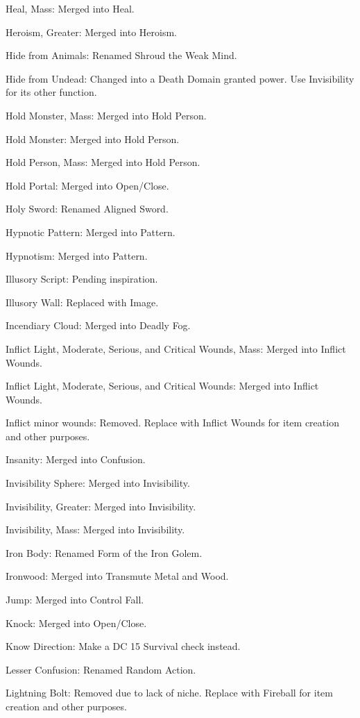 {\begin{list}{}{\leftmargin=1em}
 \item Heal, Mass: Merged into Heal.
 \item Heroism, Greater: Merged into Heroism.
 \item Hide from Animals: Renamed Shroud the Weak Mind.
 \item Hide from Undead: Changed into a Death Domain granted power. Use Invisibility for its other function.
 \item Hold Monster, Mass: Merged into Hold Person.
 \item Hold Monster: Merged into Hold Person.
 \item Hold Person, Mass: Merged into Hold Person.
 \item Hold Portal: Merged into Open/Close.
 \item Holy Sword: Renamed Aligned Sword.
 \item Hypnotic Pattern: Merged into Pattern.
 \item Hypnotism: Merged into Pattern.
 \item Illusory Script: Pending inspiration.
 \item Illusory Wall: Replaced with Image. 
 \item Incendiary Cloud: Merged into Deadly Fog.
 \item Inflict Light, Moderate, Serious, and Critical Wounds, Mass: Merged into Inflict Wounds.
 \item Inflict Light, Moderate, Serious, and Critical Wounds: Merged into Inflict Wounds.
 \item Inflict minor wounds: Removed. Replace with Inflict Wounds for item creation and other purposes.
 \item Insanity: Merged into Confusion.
 \item Invisibility Sphere: Merged into Invisibility.
 \item Invisibility, Greater: Merged into Invisibility.
 \item Invisibility, Mass: Merged into Invisibility.
 \item Iron Body: Renamed Form of the Iron Golem.
 \item Ironwood: Merged into Transmute Metal and Wood.
 \item Jump: Merged into Control Fall.
 \item Knock: Merged into Open/Close.
 \item Know Direction: Make a DC 15 Survival check instead.
 \item Lesser Confusion: Renamed Random Action.
 \item Lightning Bolt: Removed due to lack of niche. Replace with Fireball for item creation and other purposes.

\end{list}}
